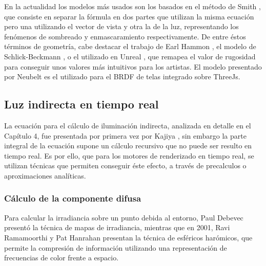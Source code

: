                 
                En la actualidad los modelos m\'as usados son los basados en el m\'etodo de Smith \autocite{smith}, que
                consiste en separar la f\'ormula en dos partes que utilizan la misma ecuaci\'on pero una utilizando el vector de vista
                y otra la de la luz, representando los fen\'omenos de sombreado y enmascaramiento respectivamente. De entre \'estos t\'erminos
                de geometr\'ia, cabe destacar el trabajo de Earl Hammon \autocite{earlhammon}, el modelo de Schlick-Beckmann \autocite{schlick},
                o el utilizado en Unreal \autocite{unreal}, que remapea el valor de rugosidad para conseguir unos valores m\'as intuitivos para
                los artistas. El modelo presentado por Neubelt \autocite{theorder} es el utilizado para el BRDF de telas integrado sobre
                ThreeJs.
                
        \subsection{Luz indirecta en tiempo real}
        La ecuaci\'on para el c\'alculo de iluminaci\'on indirecta, analizada en detalle en el Cap\'itulo 4, fue presentada por primera vez
        por Kajiya \autocite{kajiya}, sin embargo la parte integral de la ecuaci\'on supone un c\'alculo recursivo que no puede ser resulto
        en tiempo real. Es por ello, que para los motores de renderizado en tiempo real, se utilizan t\'ecnicas que permiten conseguir
        \'este efecto, a trav\'es de precalculos o aproximaciones anal\'iticas.

            \subsubsection*{C\'alculo de la componente difusa}
            Para calcular la irradiancia sobre un punto debida al entorno, Paul Debevec \autocite{debevec} present\'o la t\'ecnica
            de mapas de irradiancia, mientras que en 2001, Ravi Ramamoorthi y Pat Hanrahan \autocite{sh} presentan la t\'ecnica de esf\'ericos har\'omicos,
            que permite la compresi\'on de informaci\'on utilizando una representaci\'on de frecuencias de color frente a espacio.

